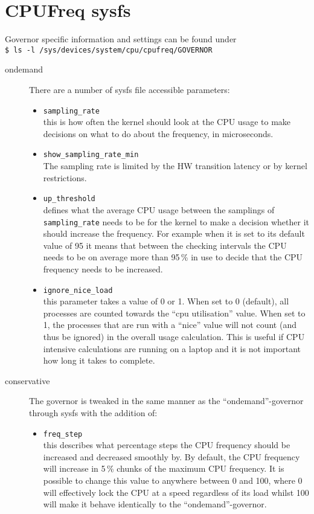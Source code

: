 %
%
\newpage
\section*{CPUFreq sysfs}
\label{sec:cpufreqsysfs}
Governor specific information and settings can be found under\\[1em]
%
\noindent
\lstinline!$ ls -l /sys/devices/system/cpu/cpufreq/GOVERNOR!

\begin{description}
\item[ondemand] There are a number of sysfs file accessible parameters:
%
\begin{multicols}{2}
\begin{itemize}
\renewcommand{\labelitemi}{\drsh}
\item \lstinline!sampling_rate!\\
	this is how often the kernel should look at the CPU usage to make decisions on what to do about the frequency, in microseconds.

\item \lstinline!show_sampling_rate_min!\\
	The sampling rate is limited by the HW transition latency or by kernel restrictions.

\item \lstinline!up_threshold!\\
	defines what the average CPU usage between the samplings of \lstinline!sampling_rate! needs to be for the kernel to make a decision whether it should increase the frequency.  For example when it is set to its default value of 95 it means that between the checking intervals the CPU needs to be on average more than 95\,\% in use to decide that the CPU frequency needs to be increased.  

\item \lstinline!ignore_nice_load!\\
	this parameter takes a value of 0 or 1. When set to 0 (default), all processes are counted towards the
``cpu utilisation'' value.  When set to 1, the processes that are run with a ``nice'' value will not count (and thus be ignored) in the overall usage calculation.  This is useful if CPU intensive calculations are running on a laptop and it is not important how long it takes to complete.
\end{itemize}
\end{multicols}
%
\item[conservative] The governor is tweaked in the same manner as the ``ondemand''-governor through sysfs with the addition of:
%
\begin{multicols}{2}
\begin{itemize}
\renewcommand{\labelitemi}{\drsh}
\item \lstinline!freq_step!\\
	this describes what percentage steps the CPU frequency should be increased and decreased smoothly by.  By default, the CPU frequency will increase in 5\,\% chunks of the maximum CPU frequency.  It is possible to change this value to anywhere between 0 and 100, where 0 will effectively lock the CPU at a speed regardless of its load whilst 100 will make it behave identically to the ``ondemand''-governor.


\end{itemize}
\end{multicols}
\end{description}
